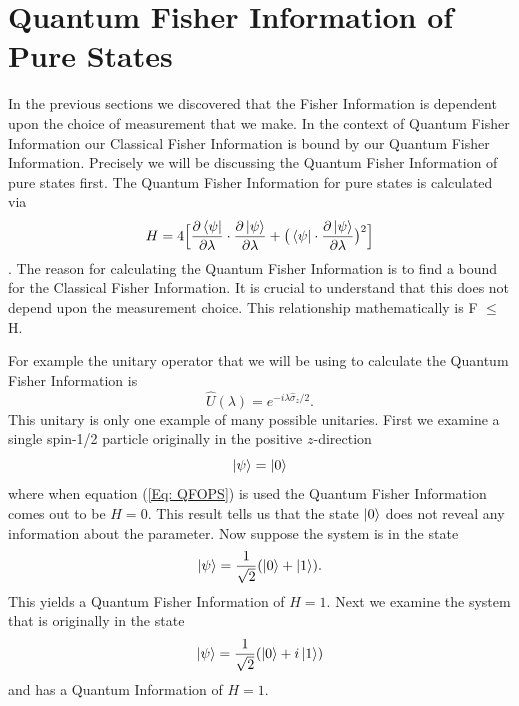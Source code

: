 \documentclass[twocolumn]{article}
\begin{document}
\section*{Quantum Fisher Information of Pure States}
In the previous sections we discovered that the Fisher Information is dependent upon the choice of measurement that we make. In the context of Quantum Fisher Information our Classical Fisher Information is bound by our Quantum Fisher Information. Precisely we will be discussing the Quantum Fisher Information of pure states first. The Quantum Fisher Information for pure states is calculated via
\begin{equation} \label{Eq: QFOPS}
H=4\Big[\frac{\partial\bra{\psi}}{\partial\lambda}\cdot\frac{\partial\ket{\psi}}{\partial\lambda}+\big(\bra{\psi}\cdot\frac{\partial\ket{\psi}}{\partial\lambda}\big)^2\Big]
\end{equation}
\cite{D. Collins}. The reason for calculating the Quantum Fisher Information is to find a bound for the Classical Fisher Information. It is crucial to understand that this does not depend upon the measurement choice. This relationship mathematically is F $\leq$ H. 

For example the unitary operator that we will be using to calculate the Quantum Fisher Information is
\begin{equation} \label{Eq: UOQFI}
\hat{U}(\lambda)=e^{-i\lambda\hat{\sigma}_z/2}.
\end{equation}
This unitary is only one example of many possible unitaries. First we examine a single spin-1/2 particle originally in the positive $z$-direction
\begin{equation} \label{Eq: S12PZ}
\ket{\psi}=\ket{0}
\end{equation}
where when equation (\ref{Eq: QFOPS}) is used the Quantum Fisher Information comes out to be $H=0$. This result tells us that the state $\ket{0}$ does not reveal any information about the parameter. Now suppose the system is in the state
\begin{equation} \label{Eq: QFIS12S1}
\ket{\psi}=\frac{1}{\sqrt{2}}(\ket{0}+\ket{1}).
\end{equation}
This yields a Quantum Fisher Information of $H=1$. Next we examine the system that is originally in the state
\begin{equation} \label{Eq: QFIS12S2}
\ket{\psi}=\frac{1}{\sqrt{2}}(\ket{0}+i\ket{1})
\end{equation}
and has a Quantum Information of $H=1$.
\end{document}
